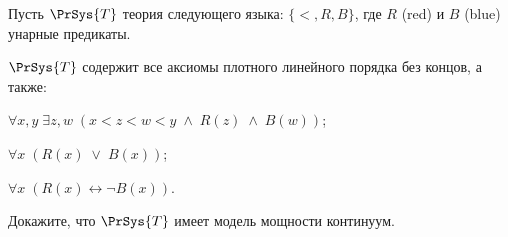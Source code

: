 Пусть $\PrSys{T}$ теория следующего языка: $\{<, R, B\}$, где $R$ (red) и $B$ (blue) унарные предикаты.
    
$\PrSys{T}$ содержит все аксиомы плотного линейного порядка без концов, а также:
\begin{itemtask}
    \item $\forall x, y \; \exists z, w \; (x < z < w < y \; \wedge \; R(z) \; \wedge \; B(w))$;
    \item $\forall x \; (R(x)\; \vee \; B(x))$;
    \item $\forall x \; (R(x) \leftrightarrow \neg B(x))$.
\end{itemtask}
    
Докажите, что $\PrSys{T}$ имеет модель мощности континуум.
